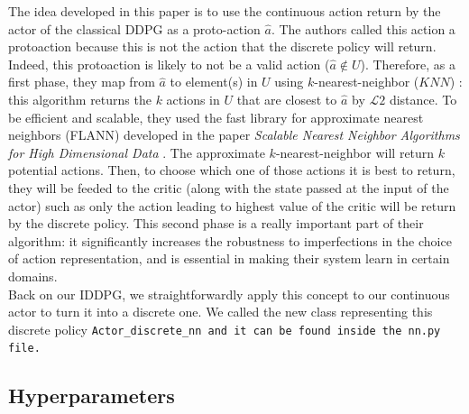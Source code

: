 The idea developed in this paper is to use the continuous action return by the actor of the classical DDPG as a proto-action $\hat{a}$. The authors called this action a proto\-action because this is not the action that the discrete policy will return. Indeed, this proto\-action is likely to not be a valid action ($\hat{a} \notin U$). Therefore, as a first phase, they map from $\hat{a}$ to element(s) in $U$ using $k$-nearest-neighbor ($KNN$) : this algorithm returns the $k$ actions in $U$ that are closest to $\hat{a}$ by $\mathcal{L}2$ distance. To be efficient and scalable, they used the fast library for approximate nearest neighbors (FLANN) developed in the paper \textit{Scalable Nearest Neighbor Algorithms
for High Dimensional Data} \cite{flann}. The approximate $k$-nearest-neighbor will return $k$ potential actions. Then, to choose which one of those actions it is best to return, they will be feeded to the critic (along with the state passed at the input of the actor) such as only the action leading to highest value of the critic will be return by the discrete policy. This second phase is a really important part of their algorithm: it significantly increases the robustness to imperfections in the choice of action representation, and is essential in making their system learn in certain domains. \\

Back on our IDDPG, we straightforwardly apply this concept to our continuous actor to turn it into a discrete one. We called the new class representing this discrete policy \tt{Actor\_discrete\_nn} and it can be found inside the \tt{nn.py} file.

\subsection{Hyperparameters}

